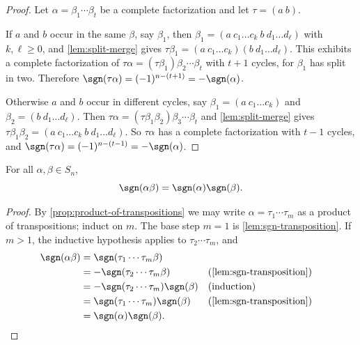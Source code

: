 \begin{proof}
	Let \(\alpha = \beta_1 \cdots \beta_t\) be a complete factorization and let
	\(\tau = (a\ b)\).

	If \(a\) and \(b\) occur in the same \(\beta\), say \(\beta_1\), then
	\(\beta_1 = (a\ c_1 \dots c_k\ b\ d_1 \dots d_\ell)\) with \(k, \ell \geq 0\), and
	\autoref{lem:split-merge} gives
	\(\tau\beta_1 = (a\ c_1 \dots c_k)(b\ d_1 \dots d_\ell)\). This exhibits a complete
	factorization of \(\tau\alpha = (\tau\beta_1)\beta_2\cdots\beta_t\) with \(t+1\) cycles,
	for \(\beta_1\) has split in two. Therefore
	\(\sgn(\tau\alpha) = (-1)^{n-(t+1)} = -\sgn(\alpha)\).

	Otherwise \(a\) and \(b\) occur in different cycles, say
	\(\beta_1 = (a\ c_1 \dots c_k)\) and \(\beta_2 = (b\ d_1 \dots d_\ell)\). Then
	\(\tau\alpha = (\tau\beta_1\beta_2)\beta_3\cdots\beta_t\) and
	\autoref{lem:split-merge} gives
	\(\tau\beta_1\beta_2 = (a\ c_1 \dots c_k\ b\ d_1 \dots d_\ell)\). So \(\tau\alpha\) has a
	complete factorization with \(t-1\) cycles, and
	\(\sgn(\tau\alpha) = (-1)^{n-(t-1)} = -\sgn(\alpha)\).
\end{proof}

\begin{theorem}\label{thm:sgn-multiplicative}
	For all \(\alpha, \beta \in S_n\),
	\[
		\sgn(\alpha\beta) = \sgn(\alpha)\sgn(\beta).
	\]
\end{theorem}

\begin{proof}
	By \autoref{prop:product-of-transpositions} we may write
	\(\alpha = \tau_1 \cdots \tau_m\) as a product of transpositions; induct on \(m\). The
	base step \(m = 1\) is \autoref{lem:sgn-transposition}. If \(m > 1\), the inductive
	hypothesis applies to \(\tau_2\cdots\tau_m\), and
	\begin{align*}
		\sgn(\alpha\beta) & = \sgn(\tau_1\cdots\tau_m\beta)                    \\
		                  & = -\sgn(\tau_2\cdots\tau_m\beta)                   && \text{(\autoref{lem:sgn-transposition})} \\
		                  & = -\sgn(\tau_2\cdots\tau_m)\sgn(\beta)             && \text{(induction)}                         \\
		                  & = \sgn(\tau_1\cdots\tau_m)\sgn(\beta)              && \text{(\autoref{lem:sgn-transposition})} \\
		                  & = \sgn(\alpha)\sgn(\beta). &&\qedhere
	\end{align*}
\end{proof}


